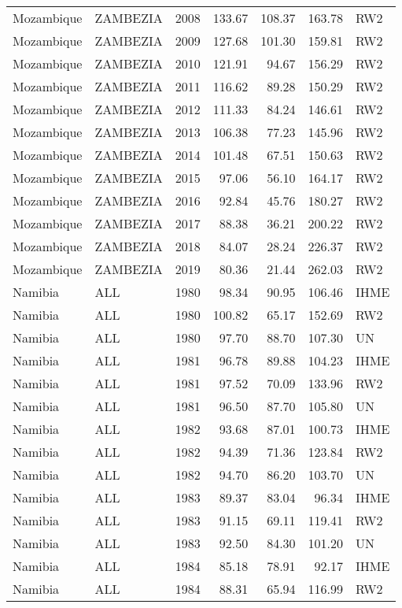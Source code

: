 \begin{longtable}{lllrrrl}
  Mozambique & ZAMBEZIA & 2008 & 133.67 & 108.37 & 163.78 & RW2 \\ 
  Mozambique & ZAMBEZIA & 2009 & 127.68 & 101.30 & 159.81 & RW2 \\ 
  Mozambique & ZAMBEZIA & 2010 & 121.91 & 94.67 & 156.29 & RW2 \\ 
  Mozambique & ZAMBEZIA & 2011 & 116.62 & 89.28 & 150.29 & RW2 \\ 
  Mozambique & ZAMBEZIA & 2012 & 111.33 & 84.24 & 146.61 & RW2 \\ 
  Mozambique & ZAMBEZIA & 2013 & 106.38 & 77.23 & 145.96 & RW2 \\ 
  Mozambique & ZAMBEZIA & 2014 & 101.48 & 67.51 & 150.63 & RW2 \\ 
  Mozambique & ZAMBEZIA & 2015 & 97.06 & 56.10 & 164.17 & RW2 \\ 
  Mozambique & ZAMBEZIA & 2016 & 92.84 & 45.76 & 180.27 & RW2 \\ 
  Mozambique & ZAMBEZIA & 2017 & 88.38 & 36.21 & 200.22 & RW2 \\ 
  Mozambique & ZAMBEZIA & 2018 & 84.07 & 28.24 & 226.37 & RW2 \\ 
  Mozambique & ZAMBEZIA & 2019 & 80.36 & 21.44 & 262.03 & RW2 \\ 
  Namibia & ALL & 1980 & 98.34 & 90.95 & 106.46 & IHME \\ 
  Namibia & ALL & 1980 & 100.82 & 65.17 & 152.69 & RW2 \\ 
  Namibia & ALL & 1980 & 97.70 & 88.70 & 107.30 & UN \\ 
  Namibia & ALL & 1981 & 96.78 & 89.88 & 104.23 & IHME \\ 
  Namibia & ALL & 1981 & 97.52 & 70.09 & 133.96 & RW2 \\ 
  Namibia & ALL & 1981 & 96.50 & 87.70 & 105.80 & UN \\ 
  Namibia & ALL & 1982 & 93.68 & 87.01 & 100.73 & IHME \\ 
  Namibia & ALL & 1982 & 94.39 & 71.36 & 123.84 & RW2 \\ 
  Namibia & ALL & 1982 & 94.70 & 86.20 & 103.70 & UN \\ 
  Namibia & ALL & 1983 & 89.37 & 83.04 & 96.34 & IHME \\ 
  Namibia & ALL & 1983 & 91.15 & 69.11 & 119.41 & RW2 \\ 
  Namibia & ALL & 1983 & 92.50 & 84.30 & 101.20 & UN \\ 
  Namibia & ALL & 1984 & 85.18 & 78.91 & 92.17 & IHME \\ 
  Namibia & ALL & 1984 & 88.31 & 65.94 & 116.99 & RW2 \\ 

\end{longtable}
